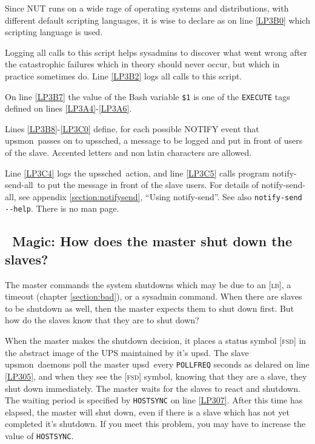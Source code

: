 \documentclass[12pt]{article}
\newlength{\headersep}\setlength{\headersep}{3mm}
\newcommand{\Hsep}{\hspace{\headersep}}
\newcommand{\newcolumn}{\vfill\eject}
\newcommand{\upsd}{\mbox{\textcolor{UPSDCOLOUR}{upsd}}}
\newcommand{\upsmon}{\mbox{\textcolor{MONCOLOUR}{upsmon}}}
\newcommand{\upssched}{\mbox{\textcolor{SCHEDCOLOUR}{upssched}}}
\newcommand{\notifysend}{\mbox{\textcolor{NOTIFYCOLOUR}{notify-send}}}
\newcommand{\notifysendall}{\mbox{\textcolor{NOTIFYCOLOUR}{notify-send-all}}}
\newcommand{\FSDst}{\textcolor{UPSDCOLOUR}{\textsc{fsd}}}
\newcommand{\LB}{\textcolor{UPSDCOLOUR}{\textsc{lb}}}
\newcommand{\status}[1]{\textcolor{UPSDCOLOUR}{[{#1}]}}
\begin{document}
Since NUT runs on a wide rage of operating systems and distributions, with
different default scripting languages, it is wise to declare as on line
\ref{LP3B0} which scripting language is used.

Logging all calls to this script helps sysadmins to discover what went wrong
after the catastrophic failures which in theory should never occur, but which
in practice sometimes do.  Line \ref{LP3B2} logs all calls to this script.

On line \ref{LP3B7} the value of the Bash variable \texttt{\$1} is one of the
\texttt{EXECUTE} tags defined on lines \ref{LP3A4}-\ref{LP3A6}.

Lines \ref{LP3B8}-\ref{LP3C0} define, for each possible NOTIFY event that
\upsmon\ passes on to \upssched, a message to be logged and put in front of
users of the slave.  Accented letters and non latin characters are allowed.

Line \ref{LP3C4} logs the \upssched\ action, and line \ref{LP3C5} calls
program \notifysendall\ to put the message in front of the slave users.  For
details of \notifysendall, see appendix \ref{section:notifysend}, ``Using
\notifysend''.  See also \texttt{notify-send -\/-help}.  There is no man page.


\newcolumn
\subsection{\Hsep\ Magic: How does the master shut down the slaves?}\label{section:magic}

The master commands the system shutdowns which may be due to an \status{\LB},
a timeout (chapter \ref{section:bad}), or a sysadmin command.  When there are
slaves to be shutdown as well, then the master expects them to shut down
first.  But how do the slaves know that they are to shut down?

When the master makes the shutdown decision, it places a status symbol
\status{\FSDst} in the abstract image of the UPS maintained by it's \upsd.
The slave \upsmon\ daemons poll the master \upsd\ every \texttt{POLLFREQ}
seconds as delared on line \ref{LP305}, and when they see the \status{\FSDst}
symbol, knowing that they are a slave, they shut down immediately.  The master
waits for the slaves to react and shutdown.  The waiting period is specified
by \texttt{HOSTSYNC} on line \ref{LP307}.  After this time has elapsed, the
master will shut down, even if there is a slave which has not yet completed
it's shutdown.  If you meet this problem, you may have to increase the value
of \texttt{HOSTSYNC}.
\end{document}
